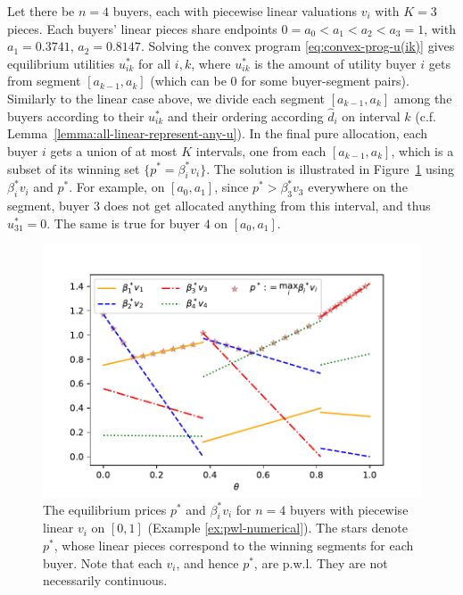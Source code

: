 \begin{example}
	 \label{ex:pwl-numerical}
	Let there be $n=4$ buyers, each with piecewise linear valuations $v_i$ with $K = 3$ pieces. Each buyers' linear pieces share endpoints $0 = a_0 < a_1 < a_2 < a_3 = 1$, with $a_1 = 0.3741$, $a_2 = 0.8147$. 
	Solving the convex program \eqref{eq:convex-prog-u(ik)} gives equilibrium utilities $u^*_{ik}$ for all $i,k$, where $u^*_{ik}$ is the amount of utility buyer $i$ gets from segment $[a_{k-1}, a_k]$ (which can be $0$ for some buyer-segment pairs). 
	Similarly to the linear case above, we divide each segment  $[a_{k-1}, a_k]$ among the buyers according to their $u^*_{ik}$ and their ordering according $\hat{d}_i$  on interval $k$ (c.f. Lemma~\ref{lemma:all-linear-represent-any-u}).
	In the final pure allocation, each buyer $i$ gets a union of at most $K$ intervals, one from each $[a_{k-1}, a_k]$, which is a subset of its winning set $\{p^* = \beta^*_i v_i\}$. 
	The solution is illustrated in Figure~\ref{fig:n-pwl} using $\beta^*_i v_i$ and $p^*$.
	For example, on $[a_0, a_1]$, since $p^* > \beta^*_3 v_3$ everywhere on the segment, buyer $3$ does not get allocated anything from this interval, and thus $u^*_{31} = 0$. The same is true for buyer $4$ on $[a_0, a_1]$. 
\end{example}

\begin{figure}
	\centering
	\includegraphics[scale=0.5]{codes/n-pwl.pdf}
	\caption{The equilibrium prices $p^*$ and $\beta^*_i v_i$ for $n=4$ buyers with piecewise linear $v_i$ on $[0,1]$ (Example \ref{ex:pwl-numerical}). The stars denote $p^*$, whose linear pieces correspond to the winning segments for each buyer.
	Note that each $v_i$, and hence $p^*$, are p.w.l. They are not necessarily continuous.}
	\label{fig:n-pwl}
\end{figure}

